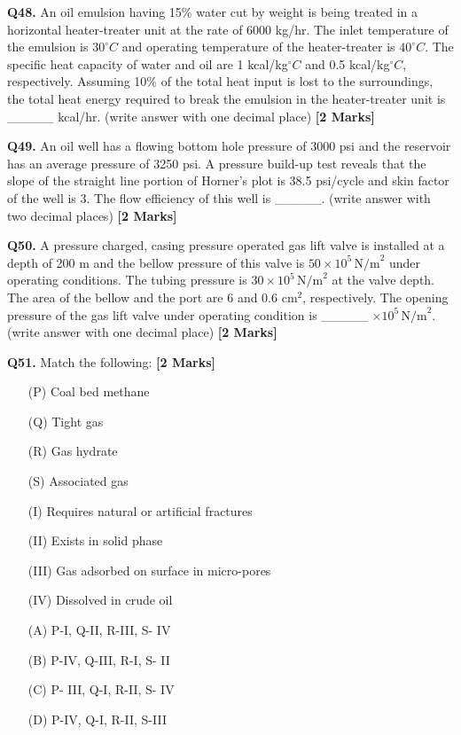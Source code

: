 \documentclass[11pt]{article}
\newcommand{\questionb}[2]{
    \noindent\textbf{Q#2.} #1 \hfill \textbf{[2 Marks]}
}
\begin{document}
\questionb{An oil emulsion having 15\% water cut by weight is being treated in a horizontal heater-treater unit at the rate of 6000 kg/hr. The inlet temperature of the emulsion is \( 30^\circ C \) and operating temperature of the heater-treater is \( 40^\circ C \). The specific heat capacity of water and oil are 1 kcal/kg\( ^\circ C \) and 0.5 kcal/kg\( ^\circ C \), respectively. Assuming 10\% of the total heat input is lost to the surroundings, the total heat energy required to break the emulsion in the heater-treater unit is \_\_\_\_\_ kcal/hr. (write answer with one decimal place)}{48}
\vspace{0.5cm}

\questionb{An oil well has a flowing bottom hole pressure of 3000 psi and the reservoir has an average pressure of 3250 psi. A pressure build-up test reveals that the slope of the straight line portion of Horner's plot is 38.5 psi/cycle and skin factor of the well is 3. The flow efficiency of this well is \_\_\_\_\_. (write answer with two decimal places)}{49}
\vspace{0.5cm}

\questionb{A pressure charged, casing pressure operated gas lift valve is installed at a depth of 200 m and the bellow pressure of this valve is \( 50 \times 10^5 \, \text{N/m}^2 \) under operating conditions. The tubing pressure is \( 30 \times 10^5 \, \text{N/m}^2 \) at the valve depth. The area of the bellow and the port are 6 and 0.6 cm\( ^2 \), respectively. The opening pressure of the gas lift valve under operating condition is \_\_\_\_\_ \( \times 10^5 \, \text{N/m}^2 \). (write answer with one decimal place)}{50}
\vspace{0.5cm}

\questionb{Match the following:}{51}
\begin{enumerate}
    \item[(P)] Coal bed methane
    \item[(Q)] Tight gas
    \item[(R)] Gas hydrate
    \item[(S)] Associated gas
    \item[(I)] Requires natural or artificial fractures
    \item[(II)] Exists in solid phase
    \item[(III)] Gas adsorbed on surface in micro-pores
    \item[(IV)] Dissolved in crude oil
    \item[(A)] P-I, Q-II, R-III, S- IV
    \item[(B)] P-IV, Q-III, R-I, S- II
    \item[(C)] P- III, Q-I, R-II, S- IV
    \item[(D)] P-IV, Q-I, R-II, S-III
\end{enumerate}
\vspace{0.5cm}
\end{document}
